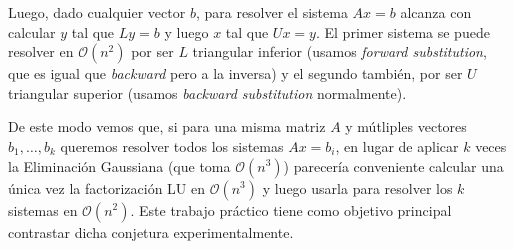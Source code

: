 Luego, dado cualquier vector $b$, para resolver el sistema $Ax=b$ alcanza con calcular $y$ tal que $Ly=b$ y luego $x$ tal que $Ux=y$. El primer sistema se puede resolver en $\mathcal{O}(n^2)$ por ser $L$ triangular inferior (usamos \emph{forward substitution}, que es igual que \emph{backward} pero a la inversa) y el segundo también, por ser $U$ triangular superior (usamos \emph{backward substitution} normalmente).

De este modo vemos que, si para una misma matriz $A$ y mútliples vectores $b_1, \ldots, b_k$ queremos resolver todos los sistemas $Ax=b_i$, en lugar de aplicar $k$ veces la Eliminación Gaussiana (que toma $\mathcal{O}(n^3)$) parecería conveniente calcular una única vez la factorización LU en $\mathcal{O}(n^3)$ y luego usarla para resolver los $k$ sistemas en $\mathcal{O}(n^2)$. Este trabajo práctico tiene como objetivo principal contrastar dicha conjetura experimentalmente.